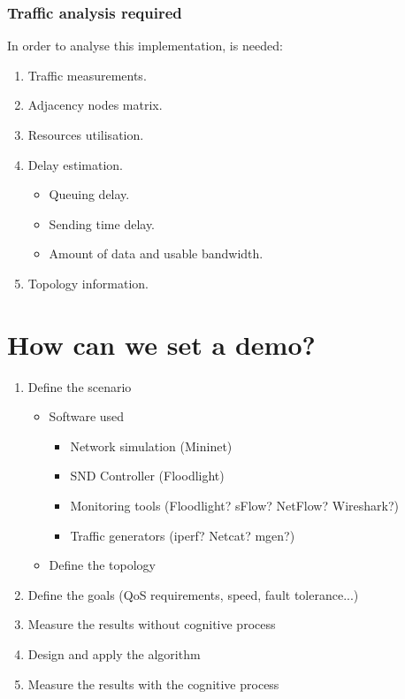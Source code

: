 \subsubsection{Traffic analysis required}
In order to analyse this implementation, is needed:
\begin{enumerate}
\item Traffic measurements.
\item Adjacency nodes matrix.
\item Resources utilisation.
\item Delay estimation.
	\begin{itemize}
	\item Queuing delay.
	\item Sending time delay.
	\item Amount of data and usable bandwidth.
	\end{itemize}
\item Topology information.  
\end{enumerate}


\section{How can we set a demo?}

\begin{enumerate}
\item Define the scenario
	\begin{itemize}
	\item Software used
		\begin{itemize}
		\item Network simulation (Mininet)
		\item SND Controller (Floodlight)
		\item Monitoring tools (Floodlight? sFlow? NetFlow? Wireshark?)
		\item Traffic generators (iperf? Netcat? mgen?)
		\end{itemize}
	\item Define the topology 
	\end{itemize}
\item Define the goals (QoS requirements, speed, fault tolerance...)
\item Measure the results without cognitive process 
\item Design and apply the algorithm
\item Measure the results with the cognitive process
\end{enumerate}



